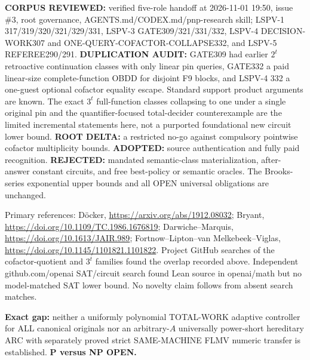 \documentclass[11pt]{article}
\begin{document}
\noindent\textbf{CORPUS REVIEWED:} verified five-role handoff at 2026-11-01 19:50, issue \#3, root governance, AGENTS.md/CODEX.md/pnp-research skill; LSPV-1 317/319/320/321/329/331, LSPV-3 GATE309/321/331/332, LSPV-4 DECISION-WORK307 and ONE-QUERY-COFACTOR-COLLAPSE332, and LSPV-5 REFEREE290/291. \textbf{DUPLICATION AUDIT:} GATE309 had earlier $2^t$ retroactive continuation classes with only linear pin queries, GATE332 a paid linear-size complete-function OBDD for disjoint F9 blocks, and LSPV-4 332 a one-guest optional cofactor equality escape. Standard support product arguments are known. The exact $3^t$ full-function classes collapsing to one under a single original pin and the quantifier-focused total-decider counterexample are the limited incremental statements here, not a purported foundational new circuit lower bound. \textbf{ROOT DELTA:} a restricted no-go against compulsory pointwise cofactor multiplicity bounds. \textbf{ADOPTED:} source authentication and fully paid recognition. \textbf{REJECTED:} mandated semantic-class materialization, after-answer constant circuits, and free best-policy or semantic oracles. The Brooks-series exponential upper bounds and all OPEN universal obligations are unchanged.

\noindent Primary references: D\"ocker, \url{https://arxiv.org/abs/1912.08032}; Bryant, \url{https://doi.org/10.1109/TC.1986.1676819}; Darwiche--Marquis, \url{https://doi.org/10.1613/JAIR.989}; Fortnow--Lipton--van Melkebeek--Viglas, \url{https://doi.org/10.1145/1101821.1101822}. Project GitHub searches of the cofactor-quotient and $3^t$ families found the overlap recorded above. Independent github.com/openai SAT/circuit search found Lean source in openai/math but no model-matched SAT lower bound. No novelty claim follows from absent search matches.

\noindent\textbf{Exact gap:} neither a uniformly polynomial TOTAL-WORK adaptive controller for ALL canonical originals nor an arbitrary-$A$ universally power-short hereditary ARC with separately proved strict SAME-MACHINE FLMV numeric transfer is established. \textbf{P versus NP OPEN.}
\end{document}
